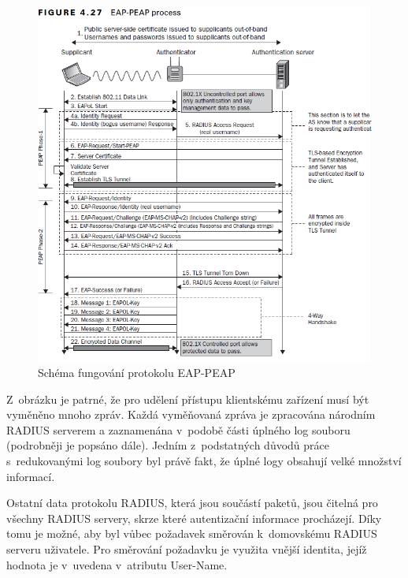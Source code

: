 \documentclass[thesis=M,czech]{FITthesis}[2012/06/26]
\begin{document}
    \begin{figure}
      \centering
        \includegraphics[scale=0.7]{eap-peap-20.png}
      \caption[Schéma fungování protokolu EAP-PEAP]{Schéma fungování protokolu EAP-PEAP \cite{eap_peap}}
      \label{fig:eap_peap}
    \end{figure}

    Z~obrázku je patrné, že pro udělení přístupu klientskému zařízení musí 
    být vyměněno mnoho zpráv.
    Každá vyměňovaná zpráva je zpracována národním RADIUS serverem
    a zaznamenána v~podobě části úplného log souboru (podrobněji je popsáno dále).
    Jedním z~podstatných důvodů práce s~redukovanými log soubory byl právě fakt, že
    úplné logy obsahují velké množství informací.

    Ostatní data protokolu RADIUS, která jsou součástí paketů,
    jsou čitelná pro všechny RADIUS servery, skrze které autentizační informace procházejí.
    Díky tomu je možné, aby byl vůbec požadavek směrován k~domovskému RADIUS serveru uživatele.
    Pro směrování požadavku je využita vnější identita, jejíž hodnota je v~uvedena v~atributu User-Name.
   
\end{document}
